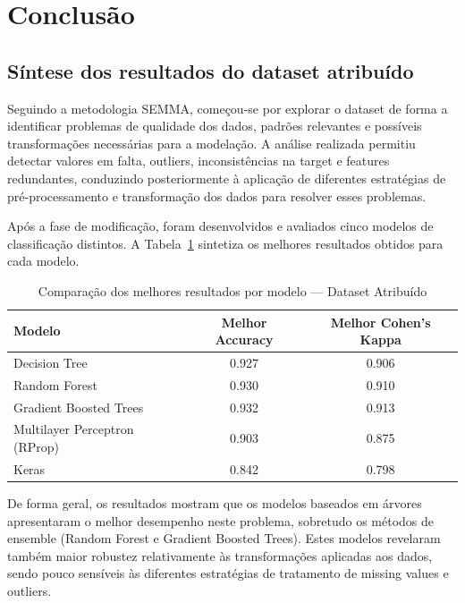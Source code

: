\documentclass[11pt,a4paper]{article}
\begin{document}
\section{Conclusão}

\subsection{Síntese dos resultados do dataset atribuído}

Seguindo a metodologia SEMMA, começou-se por explorar o dataset de forma a identificar problemas de qualidade dos dados, padrões relevantes e possíveis transformações necessárias para a modelação. A análise realizada permitiu detectar valores em falta, outliers, inconsistências na target e features redundantes, conduzindo posteriormente à aplicação de diferentes estratégias de pré-processamento e transformação dos dados para resolver esses problemas.

Após a fase de modificação, foram desenvolvidos e avaliados cinco modelos de classificação distintos. A Tabela~\ref{tab:comparacao_final} sintetiza os melhores resultados obtidos para cada modelo.

\begin{table}[H]
\centering
\caption{Comparação dos melhores resultados por modelo --- Dataset Atribuído}
\label{tab:comparacao_final}
\begin{tabular}{lcc}
\toprule
\textbf{Modelo} & \textbf{Melhor Accuracy} & \textbf{Melhor Cohen's Kappa} \\
\midrule
Decision Tree & 0.927 & 0.906 \\
Random Forest & 0.930 & 0.910 \\
Gradient Boosted Trees & 0.932 & 0.913 \\
Multilayer Perceptron (RProp) & 0.903 & 0.875 \\
Keras & 0.842 & 0.798 \\
\bottomrule
\end{tabular}
\end{table}

De forma geral, os resultados mostram que os modelos baseados em árvores apresentaram o melhor desempenho neste problema, sobretudo os métodos de ensemble (Random Forest e Gradient Boosted Trees). Estes modelos revelaram também maior robustez relativamente às transformações aplicadas aos dados, sendo pouco sensíveis às diferentes estratégias de tratamento de missing values e outliers.
\end{document}
